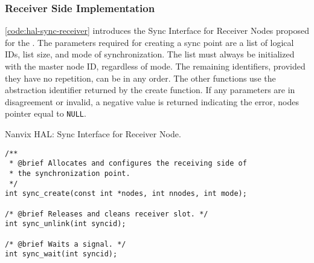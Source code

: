 			\subsubsection{Receiver Side Implementation}


				\autoref{code:hal-sync-receiver} introduces the Sync Interface for Receiver Nodes proposed for the \nanvix \hal. The parameters required for creating a sync point are a list of logical IDs, list size, and mode of synchronization. The list must always be initialized with the master node ID, regardless of mode. The remaining identifiers, provided they have no repetition, can be in any order. The other functions use the abstraction identifier returned by the create function. If any parameters are in disagreement or invalid, a negative value is returned indicating the error, \eg nodes pointer equal to \texttt{NULL}.

\begin{listing}[!tb]
\caption{Nanvix HAL: Sync Interface for Receiver Node.}
\label{code:hal-sync-receiver}
\begin{verbatim}
/**
 * @brief Allocates and configures the receiving side of
 * the synchronization point.
 */
int sync_create(const int *nodes, int nnodes, int mode);

/* @brief Releases and cleans receiver slot. */
int sync_unlink(int syncid);

/* @brief Waits a signal. */
int sync_wait(int syncid);
\end{verbatim}
\end{listing}

